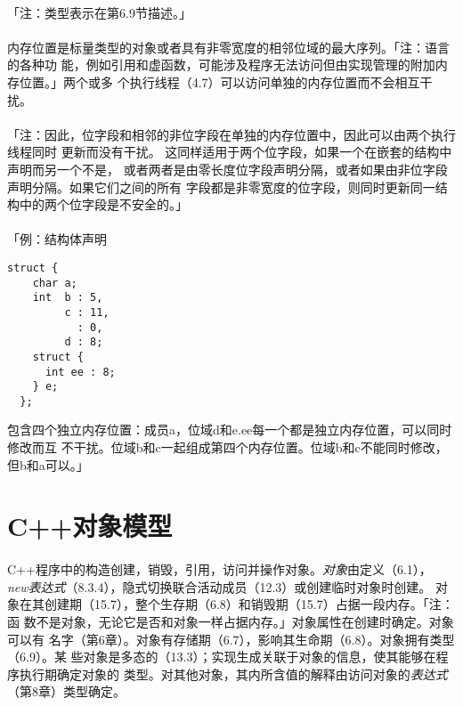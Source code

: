 \paragraph{}
「注：类型表示在第6.9节描述。」

\paragraph{}
内存位置是标量类型的对象或者具有非零宽度的相邻位域的最大序列。「注：语言的各种功
能，例如引用和虚函数，可能涉及程序无法访问但由实现管理的附加内存位置。」两个或多
个执行线程（4.7）可以访问单独的内存位置而不会相互干扰。

\paragraph{}
「注：因此，位字段和相邻的非位字段在单独的内存位置中，因此可以由两个执行线程同时
更新而没有干扰。 这同样适用于两个位字段，如果一个在嵌套的结构中声明而另一个不是，
或者两者是由零长度位字段声明分隔，或者如果由非位字段声明分隔。如果它们之间的所有
字段都是非零宽度的位字段，则同时更新同一结构中的两个位字段是不安全的。」

\paragraph{}
「例：结构体声明
\begin{lstlisting}[mathescape]
  struct {
    char a;
    int  b : 5,
         c : 11,
           : 0,
         d : 8;
    struct {
      int ee : 8;
    } e;
  };
\end{lstlisting}
包含四个独立内存位置：成员a，位域d和e.ee每一个都是独立内存位置，可以同时修改而互
不干扰。位域b和c一起组成第四个内存位置。位域b和c不能同时修改，但b和a可以。」

\section{C++对象模型}

\paragraph{}
C++程序中的构造创建，销毁，引用，访问并操作对象。\textit{对象}由定义（6.1），
\textit{new表达式}（8.3.4），隐式切换联合活动成员（12.3）或创建临时对象时创建。
对象在其创建期（15.7），整个生存期（6.8）和销毁期（15.7）占据一段内存。「注：函
数不是对象，无论它是否和对象一样占据内存。」对象属性在创建时确定。对象可以有
名字（第6章）。对象有存储期（6.7），影响其生命期（6.8）。对象拥有类型（6.9）。某
些对象是多态的（13.3）；实现生成关联于对象的信息，使其能够在程序执行期确定对象的
类型。对其他对象，其内所含值的解释由访问对象的\textit{表达式}（第8章）类型确定。

